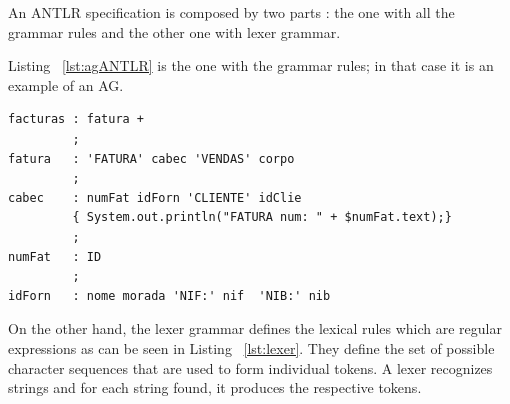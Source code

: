 \documentclass[
  oneside,
  11pt, a4paper,
  footinclude=true,
  headinclude=true,
  cleardoublepage=empty
]{scrbook}
\begin{document}
An ANTLR specification is composed by two parts : the one with all the grammar rules and the other one with lexer grammar.

Listing ~\ref{lst:agANTLR} is the one with the grammar rules; in that case it is an  example of an AG.

\begin{lstlisting}[caption={AG representation on ANTLR},label={lst:agANTLR}]
facturas : fatura +
         ;
fatura   : 'FATURA' cabec 'VENDAS' corpo
         ;
cabec    : numFat idForn 'CLIENTE' idClie
         { System.out.println("FATURA num: " + $numFat.text);}
         ;
numFat   : ID
         ;
idForn   : nome morada 'NIF:' nif  'NIB:' nib
\end{lstlisting}


On the other hand, the lexer grammar defines the lexical rules which are regular expressions as can be seen in Listing ~\ref{lst:lexer}. They define the set of possible character sequences that are used to form individual tokens. A lexer recognizes strings and for each string found, it produces the respective tokens. %

\end{document}
